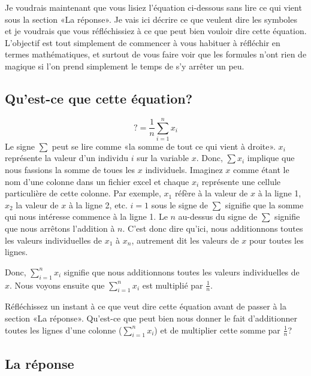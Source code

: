 \documentclass[
]{book}
\begin{document}
Je voudrais maintenant que vous lisiez l'équation ci-dessous sans lire ce qui vient sous la section «La réponse». Je vais ici décrire ce que veulent dire les symboles et je voudrais que vous réfléchissiez à ce que peut bien vouloir dire cette équation. L'objectif est tout simplement de commencer à vous habituer à réfléchir en termes mathématiques, et surtout de vous faire voir que les formules n'ont rien de magique si l'on prend simplement le temps de s'y arrêter un peu.

\hypertarget{quest-ce-que-cette-uxe9quation}{%
\subsection{Qu'est-ce que cette équation?}\label{quest-ce-que-cette-uxe9quation}}

\[? = \frac { 1 }{ n } \sum_{ i=1 }^{ n }{ x_i }\]
Le signe \(\sum\) peut se lire comme «la somme de tout ce qui vient à droite». \(x_i\) représente la valeur d'un individu \(i\) sur la variable \(x\). Donc, \(\sum x_i\) implique que nous fassions la somme de toues les \(x\) individuels. Imaginez \(x\) comme étant le nom d'une colonne dans un fichier excel et chaque \(x_i\) représente une cellule particulière de cette colonne. Par exemple, \(x_1\) réfère à la valeur de \(x\) à la ligne 1, \(x_2\) la valeur de \(x\) à la ligne 2, etc. \(i=1\) sous le signe de \(\sum\) signifie que la somme qui nous intéresse commence à la ligne 1. Le \(n\) au-dessus du signe de \(\sum\) signifie que nous arrêtons l'addition à \(n\). C'est donc dire qu'ici, nous additionnons toutes les valeurs individuelles de \(x_1\) à \(x_n\), autrement dit les valeurs de \(x\) pour toutes les lignes.

Donc, \(\sum_{ i=1 }^{ n }{ x_i }\) signifie que nous additionnons toutes les valeurs individuelles de \(x\). Nous voyons ensuite que \(\sum_{ i=1 }^{ n }{ x_i }\) est multiplié par \(\frac { 1 }{ n }\).

Réfléchissez un instant à ce que veut dire cette équation avant de passer à la section «La réponse». Qu'est-ce que peut bien nous donner le fait d'additionner toutes les lignes d'une colonne (\(\sum_{ i=1 }^{ n }{ x_i }\)) et de multiplier cette somme par \(\frac { 1 }{ n }\)?

\hypertarget{la-ruxe9ponse}{%
\subsection{La réponse}\label{la-ruxe9ponse}}
\end{document}
